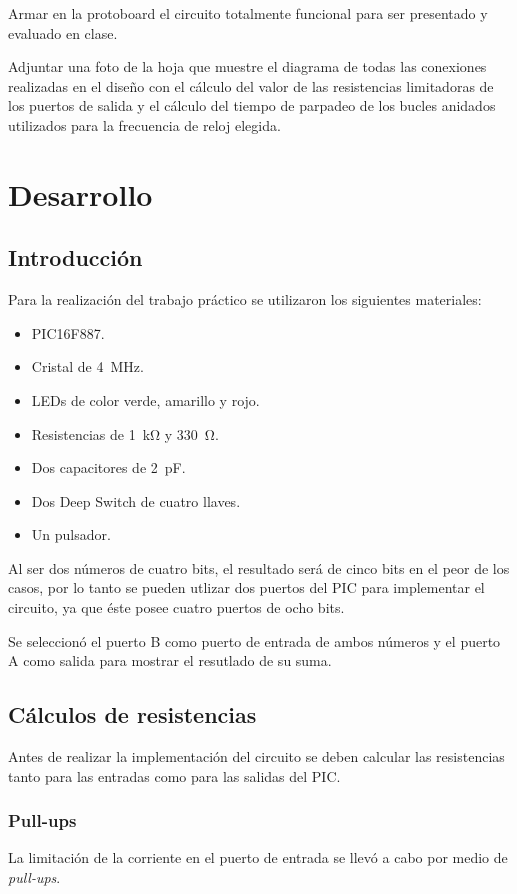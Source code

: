 \documentclass[12pt,a4paper]{article}
\begin{document}
	Armar en la protoboard el circuito totalmente funcional para ser presentado y evaluado en clase.
	
	Adjuntar una foto de la hoja que muestre el diagrama de todas las conexiones realizadas en el diseño con el cálculo del valor de las resistencias limitadoras de los puertos de salida y el cálculo del tiempo de parpadeo de los bucles anidados utilizados para la frecuencia de reloj elegida.

\newpage

\section{Desarrollo}
\subsection{Introducción}
	Para la realización del trabajo práctico se utilizaron los siguientes materiales:
	
	\begin{itemize}[leftmargin=1.5cm,nosep]
	\item PIC16F887.
	\item Cristal de \SI{4}{\MHz}.
	\item LEDs de color verde, amarillo y rojo.
	\item Resistencias de \SI{1}{\kilo\ohm} y \SI{330}{\ohm}.
	\item Dos capacitores de \SI{2}{\pF}.
	\item Dos Deep Switch de cuatro llaves.
	\item Un pulsador.
	\end{itemize}

	Al ser dos números de cuatro bits, el resultado será de cinco bits en el peor de los casos, por lo tanto se pueden utlizar dos puertos del PIC para implementar el circuito, ya  que éste posee cuatro puertos de ocho bits.
	
	Se seleccionó el puerto B como puerto de entrada de ambos números y el puerto A como salida para mostrar el resutlado de su suma.
	
\subsection{Cálculos de resistencias}
	Antes de realizar la implementación del circuito se deben calcular las resistencias tanto para las entradas como para las salidas del PIC.
	
\subsubsection{Pull-ups}
	La limitación de la corriente en el puerto de entrada se llevó a cabo por medio de \emph{pull-ups}.
	
\end{document}
